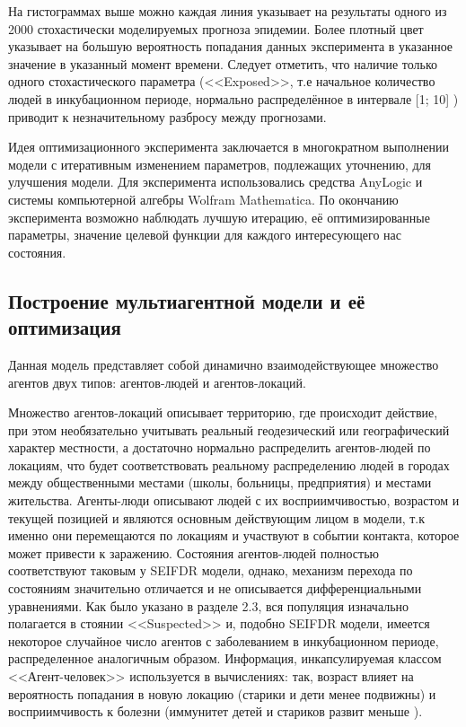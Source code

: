 
На гистограммах выше можно каждая линия указывает на результаты одного из 2000 стохастически моделируемых прогноза эпидемии.  Более плотный цвет указывает на большую вероятность попадания данных эксперимента в указанное значение в указанный момент времени. Следует отметить, что наличие только одного стохастического параметра (<<Exposed>>, т.е начальное количество людей в инкубационном периоде, нормально распределённое в интервале [1; 10] ) приводит  к незначительному разбросу между прогнозами.

Идея  оптимизационного  эксперимента заключается в многократном выполнении модели с итеративным изменением параметров, подлежащих уточнению, для улучшения модели. Для эксперимента использовались средства AnyLogic  и системы компьютерной алгебры Wolfram Mathematica. По окончанию эксперимента возможно наблюдать лучшую итерацию, её оптимизированные параметры, значение целевой функции для каждого интересующего нас состояния.

\subsection{Построение мультиагентной модели и её оптимизация}

Данная модель представляет собой динамично взаимодействующее множество агентов двух типов: агентов-людей и агентов-локаций. 

Множество агентов-локаций описывает территорию, где происходит действие, при этом необязательно учитывать реальный геодезический или географический характер местности, а достаточно нормально распределить агентов-людей по локациям, что будет соответствовать реальному распределению людей в городах между общественными местами (школы, больницы, предприятия) и местами жительства.    Агенты-люди описывают людей с их восприимчивостью, возрастом и текущей позицией и являются основным действующим лицом в модели, т.к именно они перемещаются по локациям и участвуют в событии контакта, которое может привести к заражению. Состояния агентов-людей полностью соответствуют таковым у SEIFDR модели, однако, механизм перехода по состояниям значительно отличается и не описывается дифференциальными уравнениями. Как было указано в разделе 2.3, вся популяция изначально полагается в стоянии  <<Suspected>> и, подобно SEIFDR модели, имеется некоторое случайное число агентов с заболеванием в инкубационном периоде, распределенное аналогичным образом. Информация, инкапсулируемая классом <<Агент-человек>> используется в вычислениях: так, возраст влияет на вероятность попадания в новую локацию (старики и дети менее подвижны) и восприимчивость к болезни (иммунитет детей и стариков развит меньше %
\cite{Parahonsky:2011}).


